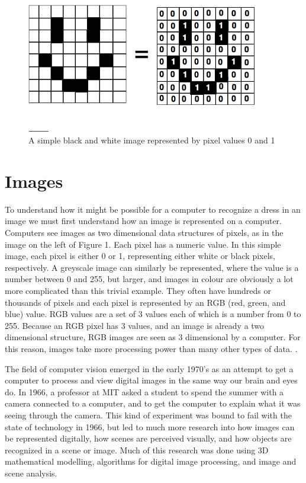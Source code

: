 \documentclass[12pt]{report} %
\begin{document}
\begin{figure}
\centering
\includegraphics[width=4in]{pixels} 
\caption{A simple black and white image represented by pixel values 0 and 1}
\label{Fig: SimpleBWPixels}
\end{figure}
	
\section{Images}
	To understand how it might be possible for a computer to recognize a dress in an image we must first understand how an image is represented on a computer. Computers see images as two dimensional data structures of pixels, as in the image on the left of Figure 1. Each pixel has a numeric value. In this simple image, each pixel is either 0 or 1, representing either white or black pixels, respectively. A greyscale image can similarly be represented, where the value is a number between 0 and 255, but larger, and images in colour are obviously a lot more complicated than this trivial example. They often have hundreds or thousands of pixels and each pixel is represented by an RGB (red, green, and blue) value. RGB values are a set of 3 values each of which is a number from 0 to 255. Because an RGB pixel has 3 values, and an image is already a two dimensional structure, RGB images are seen as 3 dimensional by a computer. For this reason, images take more processing power than many other types of data. \cite{szeliski2010computer}. 
	
	The field of computer vision emerged in the early 1970's as an attempt to get a computer to process and view digital images in the same way our brain and eyes do. In 1966, a professor at MIT asked a student to spend the summer with a camera connected to a computer, and to get the computer to explain what it was seeing through the camera. This kind of experiment was bound to fail with the state of technology in 1966, but led to much more research into how images can be represented digitally, how scenes are perceived visually, and how objects are recognized in a scene or image. Much of this research was done using 3D mathematical modelling, algorithms for digital image processing, and image and scene analysis. \cite{szeliski2010computer}
\end{document}
